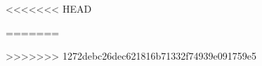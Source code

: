 \documentclass[oneside,11pt]{book}
\begin{document}
\mainmatter


<<<<<<< HEAD










	

=======
	\pagebreak


	\pagebreak


	\pagebreak


	\clearpage


	\pagebreak


	\pagebreak
	

	\pagebreak
>>>>>>> 1272debc26dec621816b71332f74939e091759e5

\listoftodos %
\end{document}
